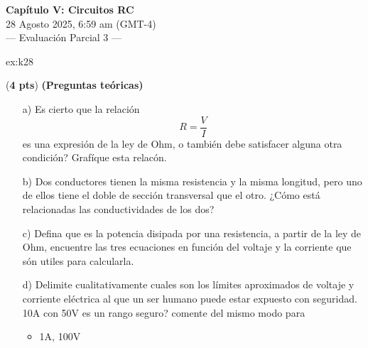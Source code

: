  \begin{multicols}{2}
   \begin{center}
         \LARGE{\textbf{Capítulo V: Circuitos RC}}\\	
         \vspace{0.2cm}
         \large{28 Agosto 2025, 6:59 am (GMT-4)}\\
         \large{— Evaluación Parcial 3 —}
     \end{center}
    \begin{excercise}[][][]{ex:k28}{(\textbf{4 pts})
        \textbf{(Preguntas teóricas)}
        \begin{itemize}
            \item[a)] Es cierto que la relación 
                \begin{equation*}
                                    R=\frac{V}{I}
                                \end{equation*}
                                es una expresión de la ley de Ohm, o también debe satisfacer alguna otra condición? Grafíque esta relacón. 
                            \item[b)] Dos conductores tienen la misma resistencia y la misma longitud, pero uno de ellos tiene el doble de sección transversal que el otro. ¿Cómo está relacionadas las conductividades de los dos?
                            \item[c)] Defina que es la potencia disipada por una resistencia, a partir de la ley de Ohm, encuentre las tres ecuaciones en función del voltaje y la corriente que són utiles para calcularla.
                            \item[d)] Delimite cualitativamente cuales son los límites aproximados de voltaje y corriente eléctrica al que un ser humano puede estar expuesto con seguridad. 10A con 50V es un rango seguro? comente del mismo modo para 
                                \begin{itemize}
                                    \item 1A, 100V

\end{itemize}
\end{itemize}}
\end{excercise}
\end{multicols}
